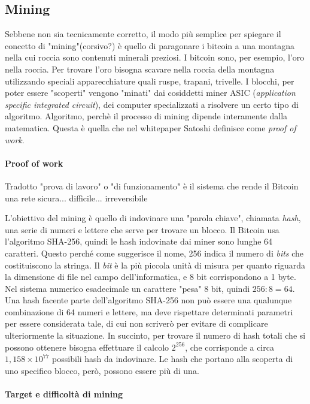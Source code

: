 \documentclass {article}
\begin{document}
\subsection {Mining}


Sebbene non sia tecnicamente corretto, il modo più semplice per spiegare il concetto di "mining"(corsivo?) è quello di paragonare i bitcoin a una montagna nella cui roccia sono contenuti minerali preziosi.
I bitcoin sono, per esempio, l'oro nella roccia.
Per trovare l'oro bisogna scavare nella roccia della montagna utilizzando speciali apparecchiature quali ruspe, trapani, trivelle.
I blocchi, per poter essere "scoperti" vengono "minati" dai cosiddetti miner ASIC (\textit{application specific integrated circuit}), dei computer specializzati a risolvere un certo tipo di algoritmo.
Algoritmo, perchè il processo di mining dipende interamente dalla matematica.
Questa è quella che nel whitepaper Satoshi definisce come \textit{proof of work}.


\paragraph {Proof of work}


Tradotto "prova di lavoro" o "di funzionamento" è il sistema che rende il Bitcoin una rete sicura... difficile... irreversibile

L'obiettivo del mining è quello di indovinare una "parola chiave", chiamata \textit{hash}, una serie di numeri e lettere che serve per trovare un blocco.
Il Bitcoin usa l'algoritmo SHA-256, quindi le hash indovinate dai miner sono lunghe 64 caratteri.
Questo perché come suggerisce il nome, 256 indica il numero di \textit{bits} che costituiscono la stringa.
Il \textit{bit} è la più piccola unità di misura per quanto riguarda la dimensione di file nel campo dell'informatica, e 8 bit corrispondono a 1 byte.
Nel sistema numerico esadecimale un carattere "pesa" 8 bit, quindi $256 : 8 = 64$.
Una hash facente parte dell'algoritmo SHA-256 non può essere una qualunque combinazione di 64 numeri e lettere, ma deve rispettare determinati parametri per essere considerata tale, di cui non scriverò per evitare di complicare ulteriormente la situazione.
In succinto, per trovare il numero di hash totali che si possono ottenere bisogna effettuare il  calcolo $2^{256}$, che corrisponde a circa $1,158 \times 10^{77}$ possibili hash da indovinare.
Le hash che portano alla scoperta di uno specifico blocco, però, possono essere più di una.

\paragraph {Target e difficoltà di mining}
\end{document}
